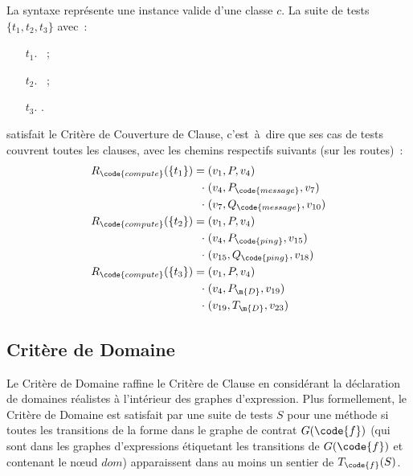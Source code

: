 \begin{example}

La syntaxe  représente une instance valide d'une classe $c$.
La suite de tests $\{t_1, t_2, t_3\}$ avec~:
%
\begin{itemize}

\item[$t_1.$]
%
~;

\item[$t_2.$]
%
~;

\item[$t_3.$]
%
.

\end{itemize}
%
satisfait le Critère de Couverture de Clause, c'est~à~dire que ses cas de tests
couvrent toutes les clauses, avec les chemins respectifs suivants (sur les
routes)~:
%
\begin{align*}
%
R_\code{compute}(\{t_1\}) =\;
          & (v_1, P, v_4) \\
  \cdot\; & (v_4, P_\code{message}, v_7) \\
  \cdot\; & (v_7, Q_\code{message}, v_{10}) \\
%
R_\code{compute}(\{t_2\}) =\;
          & (v_1, P, v_4) \\
  \cdot\; & (v_4, P_\code{ping}, v_{15}) \\
  \cdot\; & (v_{15}, Q_\code{ping}, v_{18}) \\
%
R_\code{compute}(\{t_3\}) =\;
          & (v_1, P, v_4) \\
  \cdot\; & (v_4, P_\m{D}, v_{19}) \\
  \cdot\; & (v_{19}, T_\m{D}, v_{23})
%
\end{align*}

\end{example}

\subsection{Critère de Domaine}

Le Critère de Domaine raffine le Critère de Clause en considérant la déclaration
de domaines réalistes à l'intérieur des graphes d'expression. Plus formellement,
le Critère de Domaine est satisfait par une suite de tests $S$ pour une méthode
 si toutes les transitions de la forme  dans le graphe de
contrat $G(\code{f})$ (qui sont dans les graphes d'expressions étiquetant les
transitions de $G(\code{f})$ et contenant le nœud $\mathit{dom}$) apparaissent
dans au moins un sentier de $T_\code{f}(S)$.


